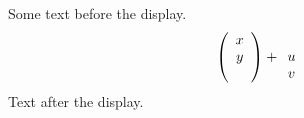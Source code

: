 \documentclass[12pt]{article}
\begin{document}
Some text before the display.
\[ \left( \begin{array}[b]{c} x \\ y \end{array} \right) + \begin{array}[t]{c} u \\ v \end{array} \]
Text after the display.
\end{document}
